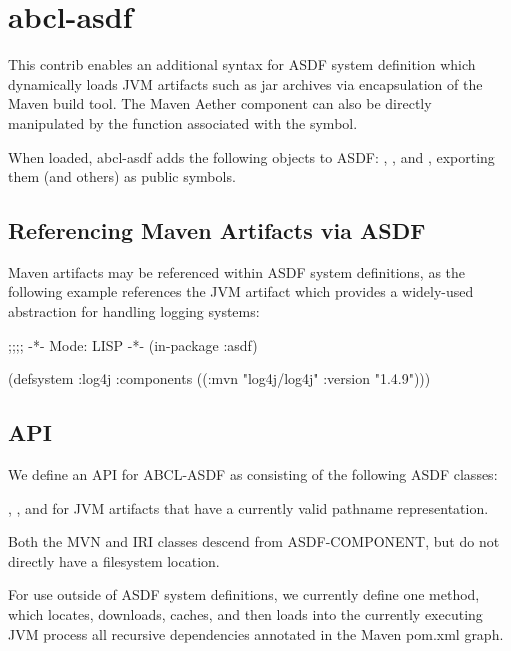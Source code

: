 \documentclass[10pt]{book}
\begin{document}
\section{abcl-asdf}

This contrib enables an additional syntax for \textsc{ASDF} system
definition which dynamically loads \textsc{JVM} artifacts such as jar
archives via encapsulation of the Maven build tool.  The Maven Aether
component can also be directly manipulated by the function associated
with the  symbol.



When loaded, abcl-asdf adds the following objects to \textsc{ASDF}:
, ,  and
, exporting them (and others) as public symbols.

\subsection{Referencing Maven Artifacts via ASDF}

Maven artifacts may be referenced within \textsc{ASDF} system
definitions, as the following example references the
 JVM artifact which provides a widely-used
abstraction for handling logging systems:

\begin{listing-lisp}
;;;; -*- Mode: LISP -*-
(in-package :asdf)

(defsystem :log4j
  :components ((:mvn "log4j/log4j" :version "1.4.9")))
\end{listing-lisp}

\subsection{API}

We define an API for \textsc{ABCL-ASDF} as consisting of the following
ASDF classes:

, , and
 for JVM artifacts that have a currently
valid pathname representation.

Both the MVN and IRI classes descend from ASDF-COMPONENT, but do not
directly have a filesystem location.

For use outside of ASDF system definitions, we currently define one
method,  which locates,
downloads, caches, and then loads into the currently executing JVM
process all recursive dependencies annotated in the Maven pom.xml
graph.
\end{document}
